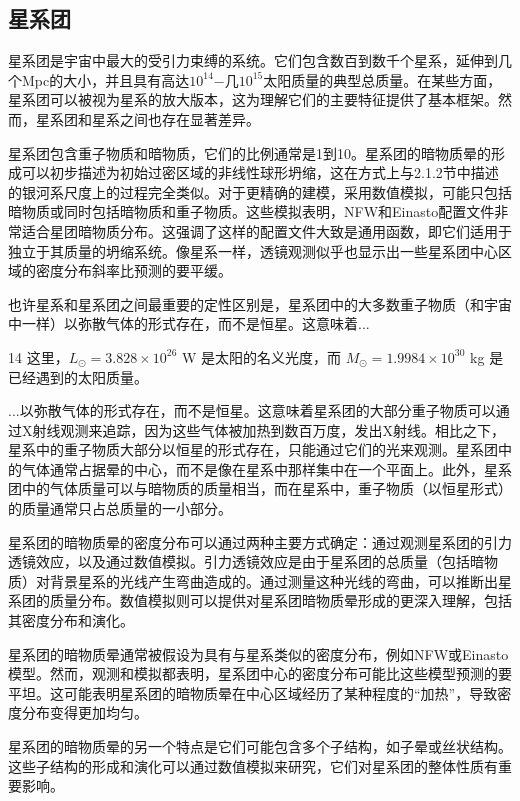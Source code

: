 \subsection{星系团}

星系团是宇宙中最大的受引力束缚的系统。它们包含数百到数千个星系，延伸到几个Mpc的大小，并且具有高达$10^{14}$−几$10^{15}$太阳质量的典型总质量。在某些方面，星系团可以被视为星系的放大版本，这为理解它们的主要特征提供了基本框架。然而，星系团和星系之间也存在显著差异。

星系团包含重子物质和暗物质，它们的比例通常是1到10。星系团的暗物质晕的形成可以初步描述为初始过密区域的非线性球形坍缩，这在方式上与2.1.2节中描述的银河系尺度上的过程完全类似。对于更精确的建模，采用数值模拟，可能只包括暗物质或同时包括暗物质和重子物质。这些模拟表明，NFW和Einasto配置文件非常适合星团暗物质分布。这强调了这样的配置文件大致是通用函数，即它们适用于独立于其质量的坍缩系统。像星系一样，透镜观测似乎也显示出一些星系团中心区域的密度分布斜率比预测的要平缓。

也许星系和星系团之间最重要的定性区别是，星系团中的大多数重子物质（和宇宙中一样）以弥散气体的形式存在，而不是恒星。这意味着...

14 这里，\( L_\odot = 3.828 \times 10^{26} \) W 是太阳的名义光度，而 \( M_\odot = 1.9984 \times 10^{30} \) kg 是已经遇到的太阳质量。

...以弥散气体的形式存在，而不是恒星。这意味着星系团的大部分重子物质可以通过X射线观测来追踪，因为这些气体被加热到数百万度，发出X射线。相比之下，星系中的重子物质大部分以恒星的形式存在，只能通过它们的光来观测。星系团中的气体通常占据晕的中心，而不是像在星系中那样集中在一个平面上。此外，星系团中的气体质量可以与暗物质的质量相当，而在星系中，重子物质（以恒星形式）的质量通常只占总质量的一小部分。

星系团的暗物质晕的密度分布可以通过两种主要方式确定：通过观测星系团的引力透镜效应，以及通过数值模拟。引力透镜效应是由于星系团的总质量（包括暗物质）对背景星系的光线产生弯曲造成的。通过测量这种光线的弯曲，可以推断出星系团的质量分布。数值模拟则可以提供对星系团暗物质晕形成的更深入理解，包括其密度分布和演化。

星系团的暗物质晕通常被假设为具有与星系类似的密度分布，例如NFW或Einasto模型。然而，观测和模拟都表明，星系团中心的密度分布可能比这些模型预测的要平坦。这可能表明星系团的暗物质晕在中心区域经历了某种程度的“加热”，导致密度分布变得更加均匀。

星系团的暗物质晕的另一个特点是它们可能包含多个子结构，如子晕或丝状结构。这些子结构的形成和演化可以通过数值模拟来研究，它们对星系团的整体性质有重要影响。

